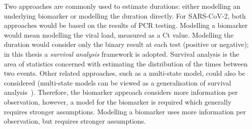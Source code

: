 \documentclass[thesis.tex]{subfiles}
\begin{document}
Two approaches are commonly used to estimate durations: either modelling an underlying biomarker or modelling the duration directly.
For SARS-CoV-2, both approaches would be based on the results of PCR testing.
Modelling a biomarker would mean modelling the viral load, measured as a Ct value.
Modelling the duration would consider only the binary result at each test (positive or negative); in this thesis a \emph{survival analysis} framework is adopted.
Survival analysis is the area of statistics concerned with estimating the distribution of the times between two events.
Other related approaches, such as a multi-state model, could also be considered (multi-state models can be viewed as a generalisation of survival analysis~\autocite{jacksonMSM}).
Therefore, the biomarker approach considers more information per observation, however, a model for the biomarker is required which generally requires stronger assumptions.
Modelling a biomarker uses more information per observation, but requires stronger assumptions.
\end{document}
